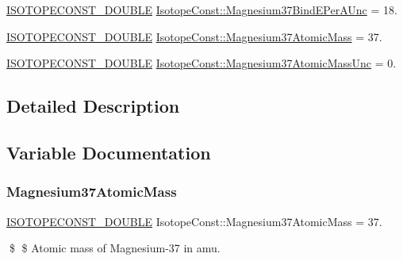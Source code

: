 \begin{DoxyCompactItemize}
\mbox{\hyperlink{group___isotope_const-_macros_ga8f45a7272ce02c0b4c65c44636ed719a}{I\+S\+O\+T\+O\+P\+E\+C\+O\+N\+S\+T\+\_\+\+D\+O\+U\+B\+LE}} \mbox{\hyperlink{group___isotope_const-_magnesium-_mg37_ga202e991e72dcd6a15883159b666b39e9}{Isotope\+Const\+::\+Magnesium37\+Bind\+E\+Per\+A\+Unc}} = 18.
\item 
\mbox{\hyperlink{group___isotope_const-_macros_ga8f45a7272ce02c0b4c65c44636ed719a}{I\+S\+O\+T\+O\+P\+E\+C\+O\+N\+S\+T\+\_\+\+D\+O\+U\+B\+LE}} \mbox{\hyperlink{group___isotope_const-_magnesium-_mg37_ga1e4b6604965e4c930225157fa4aa375b}{Isotope\+Const\+::\+Magnesium37\+Atomic\+Mass}} = 37.
\item 
\mbox{\hyperlink{group___isotope_const-_macros_ga8f45a7272ce02c0b4c65c44636ed719a}{I\+S\+O\+T\+O\+P\+E\+C\+O\+N\+S\+T\+\_\+\+D\+O\+U\+B\+LE}} \mbox{\hyperlink{group___isotope_const-_magnesium-_mg37_ga9412370b7110a0900de32680036620df}{Isotope\+Const\+::\+Magnesium37\+Atomic\+Mass\+Unc}} = 0.
\end{DoxyCompactItemize}


\subsection{Detailed Description}


\subsection{Variable Documentation}
\mbox{\label{group___isotope_const-_magnesium-_mg37_ga1e4b6604965e4c930225157fa4aa375b}} 
\subsubsection{\texorpdfstring{Magnesium37\+Atomic\+Mass}{Magnesium37AtomicMass}}
{\footnotesize\ttfamily \mbox{\hyperlink{group___isotope_const-_macros_ga8f45a7272ce02c0b4c65c44636ed719a}{I\+S\+O\+T\+O\+P\+E\+C\+O\+N\+S\+T\+\_\+\+D\+O\+U\+B\+LE}} Isotope\+Const\+::\+Magnesium37\+Atomic\+Mass = 37.}

\$ \$ Atomic mass of Magnesium-\/37 in amu. \mbox{\label{group___isotope_const-_magnesium-_mg37_ga9412370b7110a0900de32680036620df}} 
